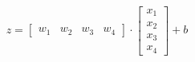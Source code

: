 \documentclass[preview]{standalone}
\begin{document}
\begin{align*}
z = \begin{bmatrix} w_1 & w_2 & w_3 & w_4 \end{bmatrix} \cdot \begin{bmatrix} x_1 \\ x_2 \\ x_3 \\ x_4 \end{bmatrix} + b
\end{align*}
\end{document}
